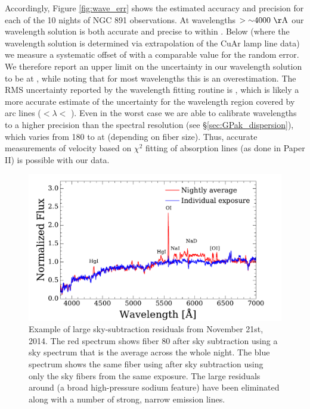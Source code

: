 Accordingly, Figure \ref{fig:wave_err} shows the estimated accuracy
and precision for each of the 10 nights of NGC 891 observations.  At
wavelengths $>\val{\asim 4000}{\AA}$ our wavelength solution is both
accurate and precise to within . Below
 (where the wavelength solution is determined via
extrapolation of the CuAr lamp line data) we measure a systematic
offset of  with a comparable value for the random
error. We therefore report an upper limit on the uncertainty in our
wavelength solution to be  at , while
noting that for most wavelengths this is an overestimation.  The RMS
uncertainty reported by the wavelength fitting routine is , which is likely a more accurate estimate of the
uncertainty for the wavelength region covered by arc lines
($<\lambda <$ ).  Even in the worst case
we are able to calibrate wavelengths to a higher precision than the
spectral resolution (see \S\ref{sec:GPak_dispersion}), which varies
from 180 to  at  (depending on fiber
size). Thus, accurate measurements of velocity based on $\chi^2$
fitting of absorption lines (as done in Paper II) is possible with our
data.



\begin{figure}
  \centering
  \includegraphics[width=\columnwidth]{891_1/figs/skysub_comp.pdf}
  \caption{\label{fig:skysub_comp}\fixspacing Example of large
    sky-subtraction residuals from November 21st, 2014. The red
    spectrum shows fiber 80 after sky subtraction using a sky spectrum
    that is the average across the whole night. The blue spectrum
    shows the same fiber using after sky subtraction using only the
    sky fibers from the same exposure. The large residuals around
     (a broad high-pressure sodium feature) have been
    eliminated along with a number of strong, narrow emission lines.}
\end{figure}

